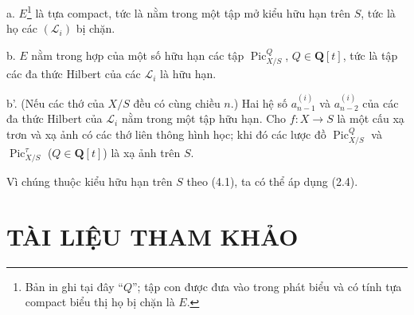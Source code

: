 \noindent a. $E$\footnote{Bản in ghi tại đây ``$Q$''; tập con được đưa vào
trong phát biểu và có tính tựa compact biểu thị họ bị chặn là $E$.} là tựa
compact, tức là nằm trong một tập mở kiểu hữu hạn trên $S$, tức là họ các
$(\mathcal L_i)$ bị chặn.

\noindent b. $E$ nằm trong hợp của một số hữu hạn các tập
$\operatorname{Pic}_{X/S}^Q$, $Q\in\mathbf Q[t]$, tức là tập các đa thức
Hilbert của các $\mathcal L_i$ là hữu hạn.

\noindent b'. (Nếu các thớ của $X/S$ đều có cùng chiều $n$.) Hai hệ số
$a_{n-1}^{(i)}$ và $a_{n-2}^{(i)}$ của các đa thức Hilbert của
$\mathcal L_i$ nằm trong một tập hữu hạn.
 Cho $f:X\longrightarrow S$ là một cấu xạ trơn và xạ ảnh
có các thớ liên thông hình học; khi đó các lược đồ
$\operatorname{Pic}_{X/S}^Q$ và $\operatorname{Pic}_{X/S}^\tau$
($Q\in\mathbf Q[t]$) là xạ ảnh trên $S$.

Vì chúng thuộc kiểu hữu hạn trên $S$ theo (4.1), ta có thể áp dụng (2.4).

\section*{TÀI LIỆU THAM KHẢO}

